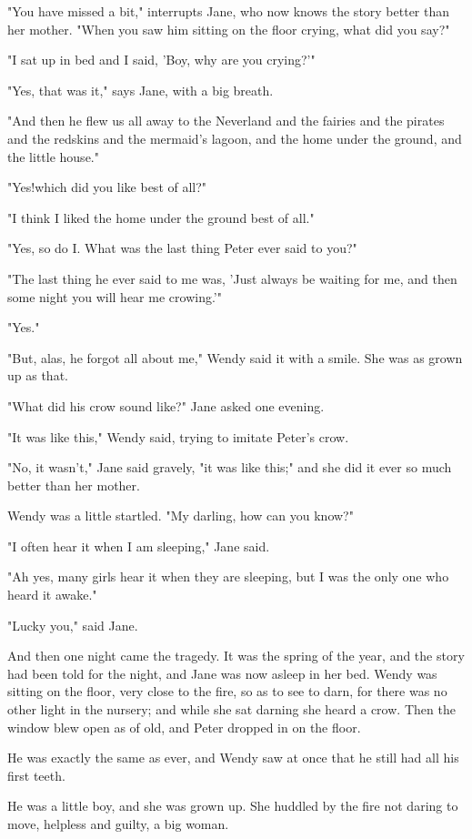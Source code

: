 "You have missed a bit," interrupts Jane,
who now knows the story better than her mother.
"When you saw him sitting on the floor crying, what did you say?"

"I sat up in bed and I said, 'Boy, why are you crying?'"

"Yes, that was it," says Jane, with a big breath.

"And then he flew us all away to the Neverland
and the fairies and the pirates and the redskins and the mermaid's lagoon,
and the home under the ground, and the little house."

"Yes!\@ which did you like best of all?"

"I think I liked the home under the ground best of all."

"Yes, so do I\@.
What was the last thing Peter ever said to you?"

"The last thing he ever said to me was,
'Just always be waiting for me, and then some night you will hear me crowing.'"

"Yes."

"But, alas, he forgot all about me," Wendy said it with a smile.
She was as grown up as that.

"What did his crow sound like?\@" Jane asked one evening.

"It was like this," Wendy said, trying to imitate Peter's crow.

"No, it wasn't," Jane said gravely, "it was like this;"
and she did it ever so much better than her mother.

Wendy was a little startled.
"My darling, how can you know?"

"I often hear it when I am sleeping," Jane said.

"Ah yes, many girls hear it when they are sleeping,
but I was the only one who heard it awake."

"Lucky you," said Jane.

And then one night came the tragedy.
It was the spring of the year, and the story had been told for the night,
and Jane was now asleep in her bed.
Wendy was sitting on the floor, very close to the fire, so as to see to darn,
for there was no other light in the nursery;
and while she sat darning she heard a crow.
Then the window blew open as of old, and Peter dropped in on the floor.

He was exactly the same as ever, and Wendy saw at once that he still had all his first teeth.

He was a little boy, and she was grown up.
She huddled by the fire not daring to move, helpless and guilty, a big woman.

